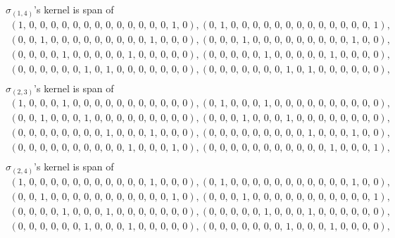 \documentclass[8pt]{article}\usepackage{amsmath}
\begin{document}
\( \sigma_{(1, 4)}\)'s kernel is span of   
\begin{align*} \left(1,\,0,\,0,\,0,\,0,\,0,\,0,\,0,\,0,\,0,\,0,\,0,\,0,\,0,\,1,\,0\right) , \left(0,\,1,\,0,\,0,\,0,\,0,\,0,\,0,\,0,\,0,\,0,\,0,\,0,\,0,\,0,\,1\right) , \\ 
 \left(0,\,0,\,1,\,0,\,0,\,0,\,0,\,0,\,0,\,0,\,0,\,0,\,1,\,0,\,0,\,0\right) , \left(0,\,0,\,0,\,1,\,0,\,0,\,0,\,0,\,0,\,0,\,0,\,0,\,0,\,1,\,0,\,0\right) , \\ 
 \left(0,\,0,\,0,\,0,\,1,\,0,\,0,\,0,\,0,\,0,\,1,\,0,\,0,\,0,\,0,\,0\right) , \left(0,\,0,\,0,\,0,\,0,\,1,\,0,\,0,\,0,\,0,\,0,\,1,\,0,\,0,\,0,\,0\right) , \\ 
 \left(0,\,0,\,0,\,0,\,0,\,0,\,1,\,0,\,1,\,0,\,0,\,0,\,0,\,0,\,0,\,0\right) , \left(0,\,0,\,0,\,0,\,0,\,0,\,0,\,1,\,0,\,1,\,0,\,0,\,0,\,0,\,0,\,0\right) , \\ \end{align*}
\( \sigma_{(2, 3)}\)'s kernel is span of   
\begin{align*} \left(1,\,0,\,0,\,0,\,1,\,0,\,0,\,0,\,0,\,0,\,0,\,0,\,0,\,0,\,0,\,0\right) , \left(0,\,1,\,0,\,0,\,0,\,1,\,0,\,0,\,0,\,0,\,0,\,0,\,0,\,0,\,0,\,0\right) , \\ 
 \left(0,\,0,\,1,\,0,\,0,\,0,\,1,\,0,\,0,\,0,\,0,\,0,\,0,\,0,\,0,\,0\right) , \left(0,\,0,\,0,\,1,\,0,\,0,\,0,\,1,\,0,\,0,\,0,\,0,\,0,\,0,\,0,\,0\right) , \\ 
 \left(0,\,0,\,0,\,0,\,0,\,0,\,0,\,0,\,1,\,0,\,0,\,0,\,1,\,0,\,0,\,0\right) , \left(0,\,0,\,0,\,0,\,0,\,0,\,0,\,0,\,0,\,1,\,0,\,0,\,0,\,1,\,0,\,0\right) , \\ 
 \left(0,\,0,\,0,\,0,\,0,\,0,\,0,\,0,\,0,\,0,\,1,\,0,\,0,\,0,\,1,\,0\right) , \left(0,\,0,\,0,\,0,\,0,\,0,\,0,\,0,\,0,\,0,\,0,\,1,\,0,\,0,\,0,\,1\right) , \\ \end{align*}
\( \sigma_{(2, 4)}\)'s kernel is span of   
\begin{align*} \left(1,\,0,\,0,\,0,\,0,\,0,\,0,\,0,\,0,\,0,\,0,\,0,\,1,\,0,\,0,\,0\right) , \left(0,\,1,\,0,\,0,\,0,\,0,\,0,\,0,\,0,\,0,\,0,\,0,\,0,\,1,\,0,\,0\right) , \\ 
 \left(0,\,0,\,1,\,0,\,0,\,0,\,0,\,0,\,0,\,0,\,0,\,0,\,0,\,0,\,1,\,0\right) , \left(0,\,0,\,0,\,1,\,0,\,0,\,0,\,0,\,0,\,0,\,0,\,0,\,0,\,0,\,0,\,1\right) , \\ 
 \left(0,\,0,\,0,\,0,\,1,\,0,\,0,\,0,\,1,\,0,\,0,\,0,\,0,\,0,\,0,\,0\right) , \left(0,\,0,\,0,\,0,\,0,\,1,\,0,\,0,\,0,\,1,\,0,\,0,\,0,\,0,\,0,\,0\right) , \\ 
 \left(0,\,0,\,0,\,0,\,0,\,0,\,1,\,0,\,0,\,0,\,1,\,0,\,0,\,0,\,0,\,0\right) , \left(0,\,0,\,0,\,0,\,0,\,0,\,0,\,1,\,0,\,0,\,0,\,1,\,0,\,0,\,0,\,0\right) , \\ \end{align*}
\end{document}
